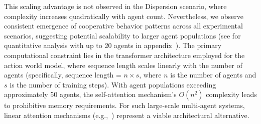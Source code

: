 This scaling advantage is not observed in the Dispersion scenario, where complexity increases quadratically with agent count. Nevertheless, we observe consistent emergence of cooperative behavior patterns across all experimental scenarios, suggesting potential scalability to larger agent populations (see  for quantitative analysis with up to 20 agents in appendix~\cite{appendix}). The primary computational constraint lies in the transformer architecture employed for the action world model, where sequence length scales linearly with the number of agents (specifically, sequence length = $n \times s$, where $n$ is the number of agents and $s$ is the number of training steps). With agent populations exceeding approximately 50 agents, the self-attention mechanism's $O(n^2)$ complexity leads to prohibitive memory requirements. For such large-scale multi-agent systems, linear attention mechanisms (e.g.,~\cite{Beltagy20}) represent a viable architectural alternative.

